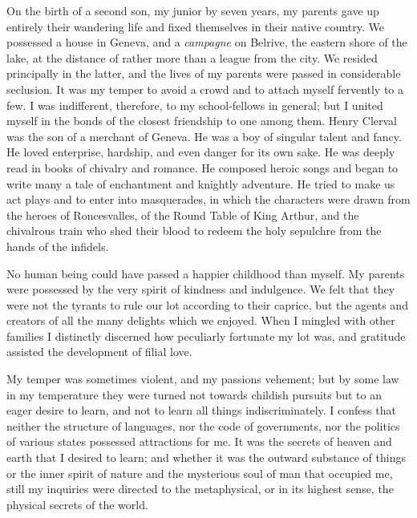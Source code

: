 \documentclass[12pt,openright]{book}
\begin{document}
On the birth of a second son, my junior by seven years, my parents gave up entirely their wandering life and fixed themselves in their native country. We possessed a house in Geneva, and a \textit{campagne} on Belrive, the eastern shore of the lake, at the distance of rather more than a league from the city. We resided principally in the latter, and the lives of my parents were passed in considerable seclusion. It was my temper to avoid a crowd and to attach myself fervently to a few. I was indifferent, therefore, to my school-fellows in general; but I united myself in the bonds of the closest friendship to one among them. Henry Clerval was the son of a merchant of Geneva. He was a boy of singular talent and fancy. He loved enterprise, hardship, and even danger for its own sake. He was deeply read in books of chivalry and romance. He composed heroic songs and began to write many a tale of enchantment and knightly adventure. He tried to make us act plays and to enter into masquerades, in which the characters were drawn from the heroes of Roncesvalles, of the Round Table of King Arthur, and the chivalrous train who shed their blood to redeem the holy sepulchre from the hands of the infidels.

No human being could have passed a happier childhood than myself. My parents were possessed by the very spirit of kindness and indulgence. We felt that they were not the tyrants to rule our lot according to their caprice, but the agents and creators of all the many delights which we enjoyed. When I mingled with other families I distinctly discerned how peculiarly fortunate my lot was, and gratitude assisted the development of filial love.

My temper was sometimes violent, and my passions vehement; but by some law in my temperature they were turned not towards childish pursuits but to an eager desire to learn, and not to learn all things indiscriminately. I confess that neither the structure of languages, nor the code of governments, nor the politics of various states possessed attractions for me. It was the secrets of heaven and earth that I desired to learn; and whether it was the outward substance of things or the inner spirit of nature and the mysterious soul of man that occupied me, still my inquiries were directed to the metaphysical, or in its highest sense, the physical secrets of the world.
\end{document}

